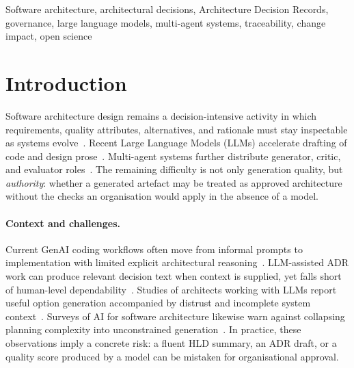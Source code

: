 \documentclass[conference]{IEEEtran}
\begin{document}
\begin{IEEEkeywords}
Software architecture, architectural decisions, Architecture Decision Records, governance, large language models, multi-agent systems, traceability, change impact, open science
\end{IEEEkeywords}

\section{Introduction}

Software architecture design remains a decision-intensive activity in which requirements, quality attributes, alternatives, and rationale must stay inspectable as systems evolve~\cite{cervantes2026llms,bucaioni2025ai}.
Recent Large Language Models (LLMs) accelerate drafting of code and design prose~\cite{dhar2024adr,pace2024archmind,cervantes2026llms}.
Multi-agent systems further distribute generator, critic, and evaluator roles~\cite{li2025maad,sami2025multiagent,waseem2026timearch}.
The remaining difficulty is not only generation quality, but \emph{authority}: whether a generated artefact may be treated as approved architecture without the checks an organisation would apply in the absence of a model.

\paragraph{Context and challenges.}
Current GenAI coding workflows often move from informal prompts to implementation with limited explicit architectural reasoning~\cite{waseem2026timearch}.
LLM-assisted ADR work can produce relevant decision text when context is supplied, yet falls short of human-level dependability~\cite{dhar2024adr}.
Studies of architects working with LLMs report useful option generation accompanied by distrust and incomplete system context~\cite{cervantes2026llms}.
Surveys of AI for software architecture likewise warn against collapsing planning complexity into unconstrained generation~\cite{bucaioni2025ai}.
In practice, these observations imply a concrete risk: a fluent HLD summary, an ADR draft, or a quality score produced by a model can be mistaken for organisational approval.
\end{document}
